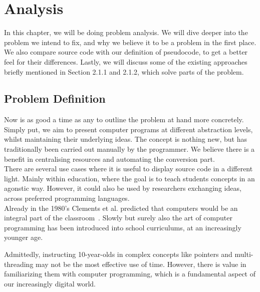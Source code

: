 \chapter{Analysis}

In this chapter, we will be doing problem analysis. We will dive deeper into the problem we intend to fix, and why we believe it to be a problem in the first place. We also compare source code with our definition of pseudocode, to get a better feel for their differences. Lastly, we will discuss some of the existing approaches briefly mentioned in Section 2.1.1 and 2.1.2, which solve parts of the problem.

\section{Problem Definition}

Now is as good a time as any to outline the problem at hand more concretely. Simply put, we aim to present computer programs at different abstraction levels, whilst maintaining their underlying ideas. The concept is nothing new, but has traditionally been carried out manually by the programmer. We believe there is a benefit in centralising resources and automating the conversion part. \\

There are several use cases where it is useful to display source code in a different light. Mainly within education, where the goal is to teach students concepts in an agonstic way. However, it could also be used by researchers exchanging ideas, across preferred programming languages. \\

Already in the 1980's Clements et al. predicted that computers would be an integral part of the classroom~\cite{computersInTheClassroom}. Slowly but surely also the art of computer programming has been introduced into school curriculums, at an increasingly younger age. \\


Admittedly, instructing 10-year-olds in complex concepts like pointers and multi-threading may not be the most effective use of time. However, there is value in familiarizing them with computer programming, which is a fundamental aspect of our increasingly digital world. \\



